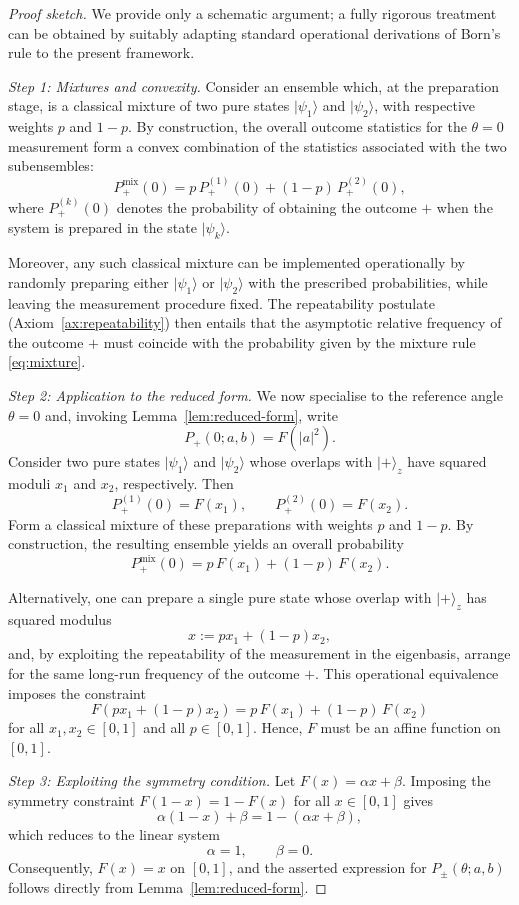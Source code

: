 \documentclass[11pt,a4paper]{article}
\numberwithin{equation}{section}
\theoremstyle{definition}
\begin{document}
\begin{proof}[Proof sketch]
We provide only a schematic argument; a fully rigorous treatment can be obtained by suitably adapting standard operational derivations of Born’s rule to the present framework.

\medskip\noindent
\emph{Step 1: Mixtures and convexity.}
Consider an ensemble which, at the preparation stage, is a classical mixture of two pure states $|\psi_1\rangle$ and $|\psi_2\rangle$, with respective weights $p$ and $1-p$. By construction, the overall outcome statistics for the $\theta=0$ measurement form a convex combination of the statistics associated with the two subensembles:
\begin{equation}
\label{eq:mixture}
P_+^{\text{mix}}(0) = p\,P_+^{(1)}(0) + (1-p)\,P_+^{(2)}(0),
\end{equation}
where $P_+^{(k)}(0)$ denotes the probability of obtaining the outcome $+$ when the system is prepared in the state $|\psi_k\rangle$.

Moreover, any such classical mixture can be implemented operationally by randomly preparing either $|\psi_1\rangle$ or $|\psi_2\rangle$ with the prescribed probabilities, while leaving the measurement procedure fixed. The repeatability postulate (Axiom~\ref{ax:repeatability}) then entails that the asymptotic relative frequency of the outcome $+$ must coincide with the probability given by the mixture rule \eqref{eq:mixture}.

\medskip\noindent
\emph{Step 2: Application to the reduced form.}
We now specialise to the reference angle $\theta = 0$ and, invoking Lemma~\ref{lem:reduced-form}, write
\[
P_+(0;a,b) = F(|a|^2).
\]
Consider two pure states $|\psi_1\rangle$ and $|\psi_2\rangle$ whose overlaps with $|+\rangle_z$ have squared moduli $x_1$ and $x_2$, respectively. Then
\[
P_+^{(1)}(0) = F(x_1),\qquad P_+^{(2)}(0) = F(x_2).
\]
Form a classical mixture of these preparations with weights $p$ and $1-p$. By construction, the resulting ensemble yields an overall probability
\[
P_+^{\text{mix}}(0) = p\,F(x_1) + (1-p)\,F(x_2).
\]

Alternatively, one can prepare a single pure state whose overlap with $|+\rangle_z$ has squared modulus
\[
x := p x_1 + (1-p)x_2,
\]
and, by exploiting the repeatability of the measurement in the eigenbasis, arrange for the same long-run frequency of the outcome $+$. This operational equivalence imposes the constraint
\[
F(p x_1 + (1-p)x_2) = p\,F(x_1) + (1-p)\,F(x_2)
\]
for all $x_1,x_2\in[0,1]$ and all $p\in[0,1]$. Hence, $F$ must be an affine function on $[0,1]$.

\medskip\noindent
\emph{Step 3: Exploiting the symmetry condition.}
Let $F(x)=\alpha x+\beta$. Imposing the symmetry constraint $F(1-x)=1-F(x)$ for all $x\in[0,1]$ gives
\[
\alpha(1-x)+\beta = 1 - (\alpha x + \beta),
\]
which reduces to the linear system
\[
\alpha = 1,\qquad \beta = 0.
\]
Consequently, $F(x)=x$ on $[0,1]$, and the asserted expression for $P_\pm(\theta;a,b)$
follows directly from Lemma~\ref{lem:reduced-form}.
\end{proof}
\end{document}
